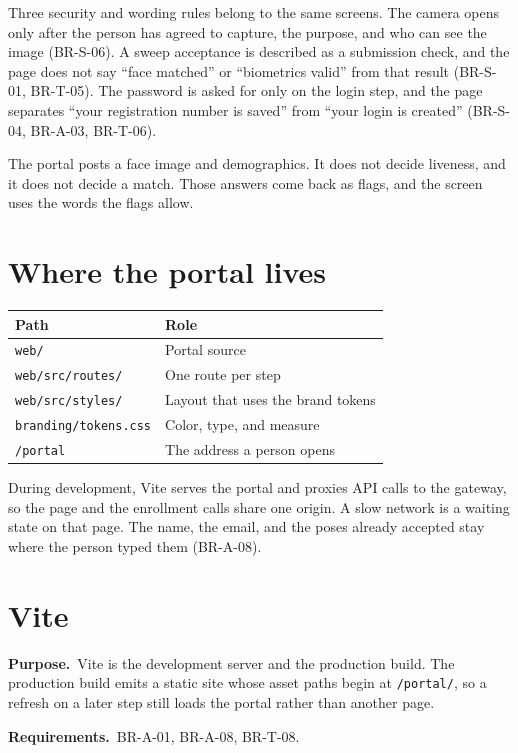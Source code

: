 \documentclass[11pt]{article}
\newcommand{\why}[1]{\textbf{Purpose.}\ #1\par}
\newcommand{\serves}[1]{\textbf{Requirements.}\ #1\par}
\begin{document}
Three security and wording rules belong to the same screens. The camera opens only after the person has agreed to capture, the purpose, and who can see the image (BR-S-06). A sweep acceptance is described as a submission check, and the page does not say ``face matched'' or ``biometrics valid'' from that result (BR-S-01, BR-T-05). The password is asked for only on the login step, and the page separates ``your registration number is saved'' from ``your login is created'' (BR-S-04, BR-A-03, BR-T-06).

The portal posts a face image and demographics. It does not decide liveness, and it does not decide a match. Those answers come back as flags, and the screen uses the words the flags allow.

\section{Where the portal lives}

\begin{center}
\begin{tabular}{@{}ll@{}}
\toprule
\textbf{Path} & \textbf{Role} \\
\midrule
\texttt{web/} & Portal source \\
\texttt{web/src/routes/} & One route per step \\
\texttt{web/src/styles/} & Layout that uses the brand tokens \\
\texttt{branding/tokens.css} & Color, type, and measure \\
\texttt{/portal} & The address a person opens \\
\bottomrule
\end{tabular}
\end{center}

During development, Vite serves the portal and proxies API calls to the gateway, so the page and the enrollment calls share one origin. A slow network is a waiting state on that page. The name, the email, and the poses already accepted stay where the person typed them (BR-A-08).

\section{Vite}

\why{Vite is the development server and the production build. The production build emits a static site whose asset paths begin at \texttt{/portal/}, so a refresh on a later step still loads the portal rather than another page.}
\serves{BR-A-01, BR-A-08, BR-T-08.}
\end{document}
